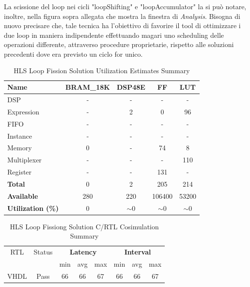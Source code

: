 La scissione del loop nei cicli "loopShifting" e "loopAccumulator" la si può notare, inoltre, nella figura sopra allegata che mostra la finestra di \textit{Analysis}. Bisogna di nuovo precisare che, tale tecnica ha l'obiettivo di favorire il tool di ottimizzare i due loop in maniera indipendente effettuando magari uno scheduling delle operazioni differente, attraverso procedure proprietarie, rispetto alle soluzioni precedenti dove era previsto un ciclo for unico. 

\begin{table}[h]
    \centering
    \begin{tabular}{|l|c|c|c|c|}
        \hline
        \textbf{Name}    & \textbf{BRAM\_18K} & \textbf{DSP48E} & \textbf{FF} & \textbf{LUT} \\ \hline
        DSP              & -                   & -               & -           & -            \\ 
        Expression       & -                   & 2               & 0           & 96          \\ 
        FIFO             & -                   & -               & -           & -            \\ 
        Instance         & -                   & -               & -           & -            \\ 
        Memory           & 0                   & -               & 74          & 8            \\ 
        Multiplexer      & -                   & -               & -           & 110          \\ 
        Register         & -                   & -               & 131         & -            \\ \hline
        \textbf{Total}   & 0                   & 2               & 205         & 214          \\ \hline
        \textbf{Available} & 280               & 220             & 106400      & 53200        \\ \hline
        \textbf{Utilization (\%)} & 0            & $\sim$0               & $\sim$0     & $\sim$0      \\ \hline
    \end{tabular}
    \caption{HLS Loop Fission Solution Utilization Estimates Summary}
    \label{tab:hls-loop-fission-solution-utilization-estimates-summary}
\end{table}

\begin{table}[H]
    \centering
    \begin{tabular}{|c|c|c|c|c|c|c|c|}
        \hline
        \multicolumn{1}{|c|}{RTL} & \multicolumn{1}{|c|}{Status} & \multicolumn{3}{c|}{\textbf{Latency}} & \multicolumn{3}{c|}{\textbf{Interval}} \\
        &  & min & avg & max & min & avg & max \\
        \hline
        VHDL & Pass & 66 & 66 & 67 & 66 & 66 & 67 \\
        \hline
    \end{tabular}
    \caption{HLS Loop Fissiong Solution C/RTL Cosimulation Summary }
    \label{tab:hls-loop-fission-solution-cosimulation-summary}
\end{table}

